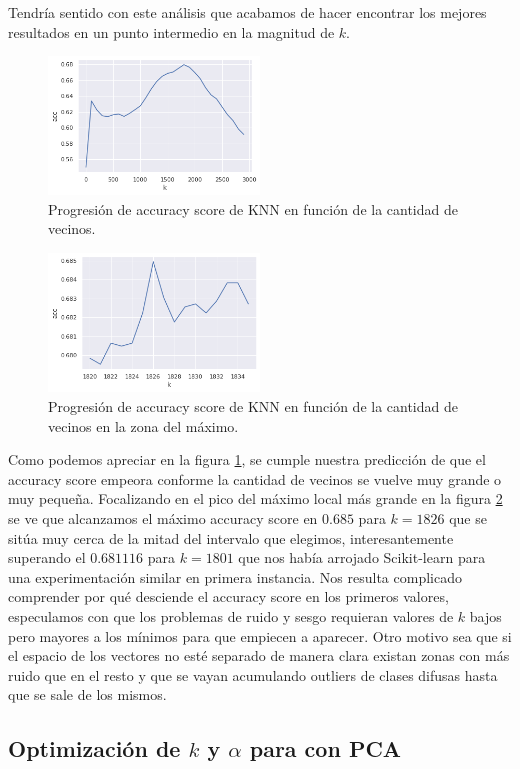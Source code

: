 Tendría sentido con este análisis que acabamos de hacer encontrar los mejores resultados en un punto intermedio en la magnitud de $k$.

\begin{figure}[h]
\includegraphics[width=0.5\textwidth]{./img/knn.png}
\centering
\caption{Progresión de accuracy score de KNN en función de la cantidad de vecinos.\label{fig:knn_acc}}

\end{figure}

\begin{figure}[h]
\includegraphics[width=0.5\textwidth]{./img/knn2.png}
\centering
\caption{Progresión de accuracy score de KNN en función de la cantidad de vecinos en la zona del máximo.\label{fig:knn_acc_2}}

\end{figure}

Como podemos apreciar en la figura \ref{fig:knn_acc}, se cumple nuestra predicción de que el accuracy score empeora conforme la cantidad de vecinos se vuelve muy grande o muy pequeña. Focalizando en el pico del máximo local más grande en la figura \ref{fig:knn_acc_2} se ve que alcanzamos el máximo accuracy score en $0.685$ para $k=1826$ que se sitúa muy cerca de la mitad del intervalo que elegimos, interesantemente superando el $0.681116$ para $k=1801$ que nos había arrojado Scikit-learn para una experimentación similar en primera instancia. Nos resulta complicado comprender por qué desciende el accuracy score en los primeros valores, especulamos con que los problemas de ruido y sesgo requieran valores de $k$ bajos pero mayores a los mínimos para que empiecen a aparecer. Otro motivo sea que si el espacio de los vectores no esté separado de manera clara existan zonas con más ruido que en el resto y que se vayan acumulando outliers de clases difusas hasta que se sale de los mismos.

\subsection{Optimización de $k$ y $\alpha$ para \knn{} con PCA}%
\label{sub:alpha_k_knn_pca}

